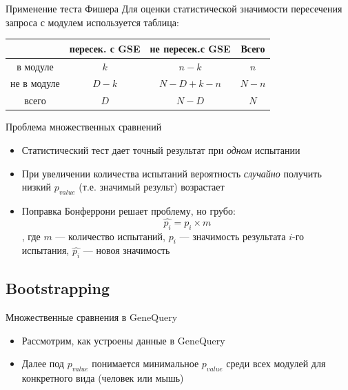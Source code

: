 \documentclass[10pt,pdf,utf8,russian,aspectratio=169]{beamer}
\begin{document}
\begin{frame}{Применение теста Фишера}
    Для оценки статистической значимости пересечения запроса с модулем используется таблица:
     \begin{table}[!ht]
        \centering
        \begin{tabular}{c|c|c|c}
                 & пересек. с GSE & не пересек.с GSE & Всего \\  \hline
        в модуле & $k$            & $n - k$          & $n$ \\ \hline
     не в модуле & $D - k$        & $N - D + k - n$  & $N - n$ \\ \hline
           всего & $D$            & $N - D$          & $N$ \\
        \end{tabular}
    \end{table}
\end{frame}

\begin{frame}{Проблема множественных сравнений}
  \begin{itemize}[<+->]
    \item Статистический тест дает точный результат при \emph{одном} испытании
    \item При увеличении количества испытаний вероятность \emph{случайно} получить низкий $p_{value}$ (т.е. значимый результ) возрастает
    \item Поправка Бонферрони решает проблему, но грубо:
    $$\hat{p_i} = p_i \times m$$, где $m$ --- количество испытаний, $p_i$ --- значимость результата $i$-го испытания, $\hat{p_i}$ --- новоя значимость
  \end{itemize}
\end{frame}

\subsection{Bootstrapping}

\begin{frame}{Множественные сравнения в GeneQuery}
  \begin{itemize}[<+->]
    \item Рассмотрим, как устроены данные в GeneQuery
    \item Далее под $p_{value}$ понимается минимальное $p_{value}$ среди всех модулей для конкретного вида (человек или мышь)
  \end{itemize}
\end{frame}
   
\end{document}
